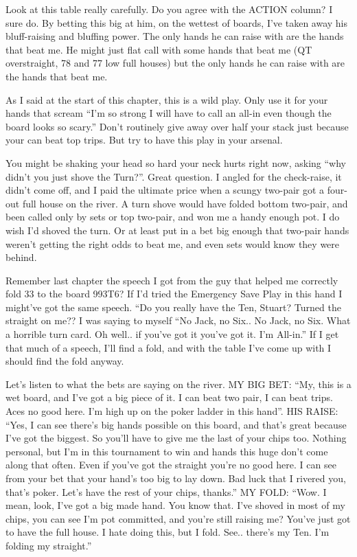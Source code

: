 Look at this table really carefully. Do you agree with the ACTION
column? I sure do. By betting this big at him, on the wettest of
boards, I've taken away his bluff-raising and bluffing power. The only
hands he can raise with are the hands that beat me. He might just
flat call with some hands that beat me (QT overstraight, 78 and 77 low
full houses) but the only hands he can raise with are the hands that
beat me.

As I said at the start of this chapter, this is a wild play. Only use it
for your hands that scream ``I'm so strong I will have to call an
all-in even though the board looks so scary.'' Don't routinely give
away over half your stack just because your can beat top trips. But
try to have this play in your arsenal.

You might be shaking your head so hard your neck hurts right now,
asking ``why didn't you just shove the Turn?''. Great question. I
angled for the check-raise, it didn't come off, and I paid the
ultimate price when a scungy two-pair got a four-out full house on the
river. A turn shove would have folded bottom two-pair, and been called
only by sets or top two-pair, and won me a handy enough pot. I do wish
I'd shoved the turn. Or at least put in a bet big enough that two-pair
hands weren't getting the right odds to beat me, and even sets would
know they were behind.

Remember last chapter the speech I got from the guy that helped me
correctly fold 33 to the board 993T6? If I'd tried the Emergency Save
Play in this hand I might've got the same speech. ``Do you really have
the Ten, Stuart? Turned the straight on me?? I was saying to myself
``No Jack, no Six.. No Jack, no Six. What a horrible turn card. Oh
well.. if you've got it you've got it. I'm All-in.'' If I get that
much of a speech, I'll find a fold, and with the table I've come up
with I should find the fold anyway.

Let's listen to what the bets are saying on the river.
MY BIG BET: ``My, this is a wet board, and I've got a big piece of
it. I can beat two pair, I can beat trips. Aces no good here. I'm high
up on the poker ladder in this hand''.
HIS RAISE: ``Yes, I can see there's big hands possible on this board,
and that's great because I've got the biggest. So you'll have to give
me the last of your chips too. Nothing personal, but I'm in this
tournament to win and hands this huge don't come along that
often. Even if you've got the straight you're no good here. I can see
from your bet that your hand's too big to lay down. Bad luck that I
rivered you, that's poker. Let's have the rest of your chips,
thanks.''
MY FOLD: ``Wow. I mean, look, I've got a big made hand. You know
that. I've shoved in most of my chips, you can see I'm pot committed,
and you're still raising me? You've just got to have the full house. I
hate doing this, but I fold. See.. there's my Ten. I'm folding my
straight.''

